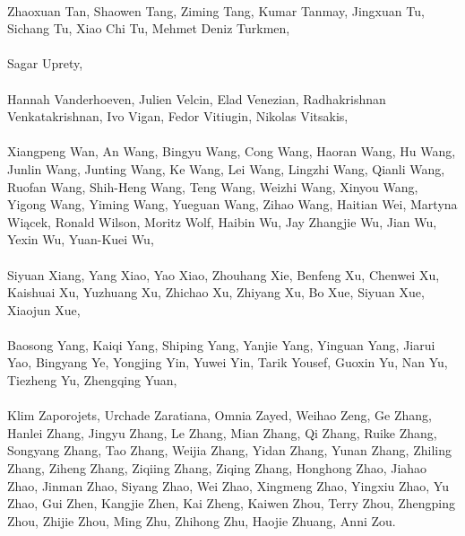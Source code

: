 \paragraph{}Zhaoxuan Tan, Shaowen Tang, Ziming Tang, Kumar Tanmay, Jingxuan Tu, Sichang Tu, Xiao Chi Tu, Mehmet Deniz Turkmen,
\paragraph{}Sagar Uprety,
\paragraph{}Hannah Vanderhoeven, Julien Velcin, Elad Venezian, Radhakrishnan Venkatakrishnan, Ivo Vigan, Fedor Vitiugin, Nikolas Vitsakis,
\paragraph{}Xiangpeng Wan, An Wang, Bingyu Wang, Cong Wang, Haoran Wang, Hu Wang, Junlin Wang, Junting Wang, Ke Wang, Lei Wang, Lingzhi Wang, Qianli Wang, Ruofan Wang, Shih-Heng Wang, Teng Wang, Weizhi Wang, Xinyou Wang, Yigong Wang, Yiming Wang, Yueguan Wang, Zihao Wang, Haitian Wei, Martyna Wiącek, Ronald Wilson, Moritz Wolf, Haibin Wu, Jay Zhangjie Wu, Jian Wu, Yexin Wu, Yuan-Kuei Wu,
\paragraph{}Siyuan Xiang, Yang Xiao, Yao Xiao, Zhouhang Xie, Benfeng Xu, Chenwei Xu, Kaishuai Xu, Yuzhuang Xu, Zhichao Xu, Zhiyang Xu, Bo Xue, Siyuan Xue, Xiaojun Xue,
\paragraph{}Baosong Yang, Kaiqi Yang, Shiping Yang, Yanjie Yang, Yinguan Yang, Jiarui Yao, Bingyang Ye, Yongjing Yin, Yuwei Yin, Tarik Yousef, Guoxin Yu, Nan Yu, Tiezheng Yu, Zhengqing Yuan,
\paragraph{}Klim Zaporojets, Urchade Zaratiana, Omnia Zayed, Weihao Zeng, Ge Zhang, Hanlei Zhang, Jingyu Zhang, Le Zhang, Mian Zhang, Qi Zhang, Ruike Zhang, Songyang Zhang, Tao Zhang, Weijia Zhang, Yidan Zhang, Yunan Zhang, Zhiling Zhang, Ziheng Zhang, Ziqiing Zhang, Ziqing Zhang, Honghong Zhao, Jiahao Zhao, Jinman Zhao, Siyang Zhao, Wei Zhao, Xingmeng Zhao, Yingxiu Zhao, Yu Zhao, Gui Zhen, Kangjie Zhen, Kai Zheng, Kaiwen Zhou, Terry Zhou, Zhengping Zhou, Zhijie Zhou, Ming Zhu, Zhihong Zhu, Haojie Zhuang, Anni Zou.

